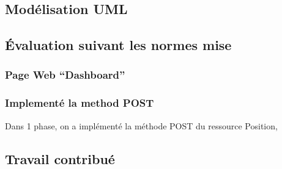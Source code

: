 
\subsection{Modélisation UML}

\subsection{Évaluation suivant les normes mise}

\subsubsection{Page Web ``Dashboard''}


\subsubsection{Implementé la method POST}

Dans 1\ier{} phase, on a implémenté la méthode POST du ressource Position,


\subsection{Travail contribué}
